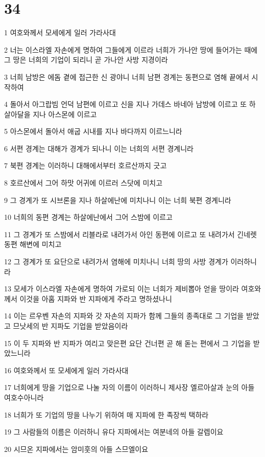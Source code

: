 \chapter{34}

\par 1 여호와께서 모세에게 일러 가라사대
\par 2 너는 이스라엘 자손에게 명하여 그들에게 이르라 너희가 가나안 땅에 들어가는 때에 그 땅은 너희의 기업이 되리니 곧 가나안 사방 지경이라
\par 3 너희 남방은 에돔 곁에 접근한 신 광야니 너희 남편 경계는 동편으로 염해 끝에서 시작하여
\par 4 돌아서 아그랍빔 언덕 남편에 이르고 신을 지나 가데스 바네아 남방에 이르고 또 하살아달을 지나 아스몬에 이르고
\par 5 아스몬에서 돌아서 애굽 시내를 지나 바다까지 이르느니라
\par 6 서편 경계는 대해가 경계가 되나니 이는 너희의 서편 경계니라
\par 7 북편 경계는 이러하니 대해에서부터 호르산까지 긋고
\par 8 호르산에서 그어 하맛 어귀에 이르러 스닷에 미치고
\par 9 그 경계가 또 시브론을 지나 하살에난에 미치나니 이는 너희 북편 경계니라
\par 10 너희의 동편 경계는 하살에난에서 그어 스밤에 이르고
\par 11 그 경계가 또 스밤에서 리블라로 내려가서 아인 동편에 이르고 또 내려가서 긴네렛 동편 해변에 미치고
\par 12 그 경계가 또 요단으로 내려가서 염해에 미치나니 너희 땅의 사방 경계가 이러하니라
\par 13 모세가 이스라엘 자손에게 명하여 가로되 이는 너희가 제비뽑아 얻을 땅이라 여호와께서 이것을 아홉 지파와 반 지파에게 주라고 명하셨나니
\par 14 이는 르우벤 자손의 지파와 갓 자손의 지파가 함께 그들의 종족대로 그 기업을 받았고 므낫세의 반 지파도 기업을 받았음이라
\par 15 이 두 지파와 반 지파가 여리고 맞은편 요단 건너편 곧 해 돋는 편에서 그 기업을 받았느니라
\par 16 여호와께서 또 모세에게 일러 가라사대
\par 17 너희에게 땅을 기업으로 나눌 자의 이름이 이러하니 제사장 엘르아살과 눈의 아들 여호수아니라
\par 18 너희가 또 기업의 땅을 나누기 위하여 매 지파에 한 족장씩 택하라
\par 19 그 사람들의 이름은 이러하니 유다 지파에서는 여분네의 아들 갈렙이요
\par 20 시므온 지파에서는 암미훗의 아들 스므엘이요
